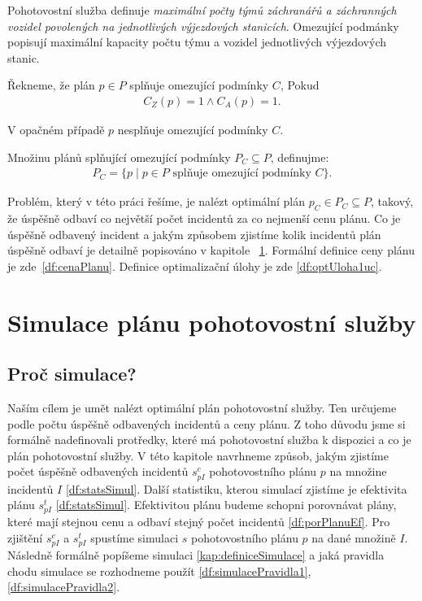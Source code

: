 Pohotovostní služba definuje \textit{maximální počty týmů záchranářů a záchranných vozidel povolených na jednotlivých výjezdových stanicích}.
Omezující podmánky popisují maximální kapacity počtu týmu a vozidel jednotlivých výjezdových stanic.

\begin{definice}
  Řekneme, že plán $p \in P$ splňuje omezující podmínky $C$, Pokud
  \begin{align*}
    C_Z(p) = 1 \land C_A(p) = 1.
  \end{align*}

  V opačném případě $p$ nesplňuje omezující podmínky $C$.
\end{definice}

\begin{definice}
  Množinu plánů splňující omezující podmínky $P_C \subseteq P$, definujme:
  \begin{align*}
    P_C = \{ p \mid \text{$p \in P$ splňuje omezující podmínky $C$} \}.
  \end{align*}
\end{definice}

Problém, který v této práci řešíme, je nalézt optimální plán $p_C \in P_C \subseteq P$, takový, že úspěšně odbaví co největší počet incidentů za co nejmenší cenu plánu.
Co je úspěšně odbavený incident a jakým způsobem zjistíme kolik incidentů plán úspěšně odbaví je detailně popisováno v kapitole ~\ref{SimulaceKap}.
Formální definice ceny plánu je zde~\ref{df:cenaPlanu}.
Definice optimalizační úlohy je zde \ref{df:optUloha1uc}.

\section{Simulace plánu pohotovostní služby}\label{SimulaceKap}

\subsection{Proč simulace?}\label{kap:procSimulace}

Naším cílem je umět nalézt optimální plán pohotovostní služby.
Ten určujeme podle počtu úspěšně odbavených incidentů a ceny plánu.
Z toho důvodu jsme si formálně nadefinovali protředky, které má pohotovostní služba k dispozici a co je plán pohotovostní služby.
V této kapitole navrhneme způsob, jakým zjistíme počet úspěšně odbavených incidentů $s^c_{pI}$ pohotovostního plánu $p$ na množine incidentů $I$ \ref{df:statsSimul}.
Další statistiku, kterou simulací zjistíme je efektivita plánu $s^t_{pI}$ \ref{df:statsSimul}.
Efektivitou plánu budeme schopni porovnávat plány, které mají stejnou cenu a odbaví stejný počet incidentů \ref{df:porPlanuEf}.
Pro zjištění $s^c_{pI}$ a $s^t_{pI}$ spustíme simulaci $s$ pohotovostního plánu $p$ na dané množině $I$.
Následně formálně popíšeme simulaci \ref{kap:definiceSimulace} a jaká pravidla chodu simulace se rozhodneme použít \ref{df:simulacePravidla1}, \ref{df:simulacePravidla2}.

